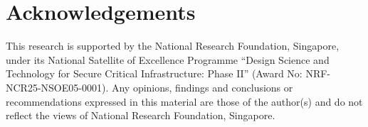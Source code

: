 \section*{Acknowledgements}
%
This research is supported by the National Research Foundation, Singapore, under its National Satellite of
Excellence Programme “Design Science and Technology for Secure Critical Infrastructure: Phase II” (Award No:
NRF-NCR25-NSOE05-0001). Any opinions, findings and conclusions or recommendations expressed in this material
are those of the author(s) and do not reflect the views of National Research Foundation, Singapore.
%